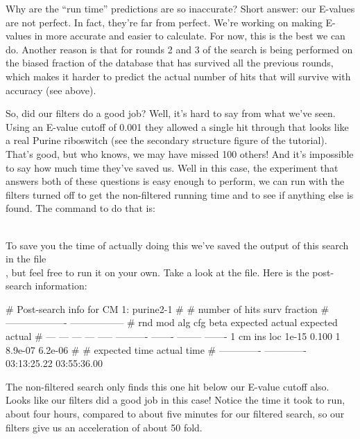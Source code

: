 \begin{srefaq}{Why are the  ``run time'' predictions are
  so inaccurate?} Short answer: our E-values are not perfect. In fact,
  they're far from perfect. We're working on making E-values in
   more accurate and easier to calculate. For now,
  this is the best we can do. Another reason is that for rounds 2 and
  3 of  the search is being performed on the biased
  fraction of the database that has survived all the previous rounds,
  which makes it harder to predict the actual number of hits that will
  survive with accuracy (see above).
\end{srefaq}

So, did our filters do a good job? Well, it's hard to say from what
we've seen. Using an E-value cutoff of 0.001 they allowed a single hit
through that looks like a real Purine riboswitch (see the secondary
structure figure of the tutorial). That's good, but who knows, we may
have missed 100 others!  And it's impossible to say how much time
they've saved us. Well in this case, the experiment that answers both
of these questions is easy enough to perform, we can run
 with the filters turned off 
to get the non-filtered running time and to see if anything else
is found. The command to do that is: 

\\

To save you the time of actually doing this we've saved the
output of this search in the file\\
 ,
but feel free to run it on your own. Take a look at the file. Here is
the post-search information:


{\samepage
\begin{sreoutput}
# Post-search info for CM 1: purine2-1
#
#                              number of hits       surv fraction  
#                            -------------------  -----------------
# rnd  mod  alg  cfg   beta    expected   actual  expected   actual
# ---  ---  ---  ---  -----  ----------  -------  --------  -------
    1   cm  ins  loc  1e-15       0.100        1   8.9e-07  6.2e-06
#
# expected time    actual time
# -------------  -------------
    03:13:25.22    03:55:36.00
\end{sreoutput}
}

The non-filtered search only finds this one hit below our E-value
cutoff also. Looks like our filters did a good job in this case!
Notice the time it took to run, about four hours, compared to about five
minutes for our filtered search, so our filters give us an
acceleration of about 50 fold. 

